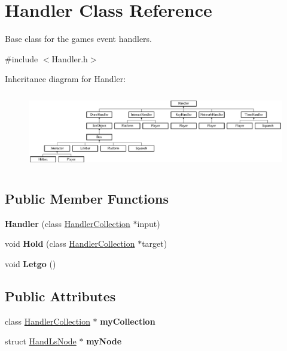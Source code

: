 \hypertarget{class_handler}{}\section{Handler Class Reference}
\label{class_handler}


Base class for the game\textquotesingle{}s event handlers.  




{\ttfamily \#include $<$Handler.\+h$>$}

Inheritance diagram for Handler\+:\begin{figure}[H]
\begin{center}
\leavevmode
\includegraphics[height=3.363363cm]{class_handler}
\end{center}
\end{figure}
\subsection*{Public Member Functions}
\begin{DoxyCompactItemize}
\item 
\hypertarget{class_handler_a65054f56eca474ad58a12067347d341c}{}\label{class_handler_a65054f56eca474ad58a12067347d341c} 
{\bfseries Handler} (class \hyperlink{class_handler_collection}{Handler\+Collection} $\ast$input)
\item 
\hypertarget{class_handler_a1d7568b0690d98cfecf0b446de9c4250}{}\label{class_handler_a1d7568b0690d98cfecf0b446de9c4250} 
void {\bfseries Hold} (class \hyperlink{class_handler_collection}{Handler\+Collection} $\ast$target)
\item 
\hypertarget{class_handler_aaccb98d642889447dc7d8645df9ef773}{}\label{class_handler_aaccb98d642889447dc7d8645df9ef773} 
void {\bfseries Letgo} ()
\end{DoxyCompactItemize}
\subsection*{Public Attributes}
\begin{DoxyCompactItemize}
\item 
\hypertarget{class_handler_a439521850c1d2a5bed66ad4e878bb5ca}{}\label{class_handler_a439521850c1d2a5bed66ad4e878bb5ca} 
class \hyperlink{class_handler_collection}{Handler\+Collection} $\ast$ {\bfseries my\+Collection}
\item 
\hypertarget{class_handler_acee999ed1680b7e1d3c71def7570d864}{}\label{class_handler_acee999ed1680b7e1d3c71def7570d864} 
struct \hyperlink{struct_hand_ls_node}{Hand\+Ls\+Node} $\ast$ {\bfseries my\+Node}
\end{DoxyCompactItemize}


